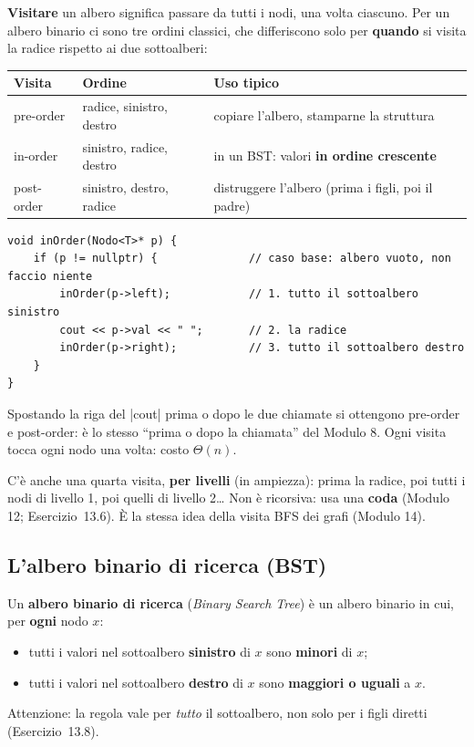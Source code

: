 \textbf{Visitare} un albero significa passare da tutti i nodi, una volta ciascuno.
Per un albero binario ci sono tre ordini classici, che differiscono solo per
\textbf{quando} si visita la radice rispetto ai due sottoalberi:
\begin{center}
\begin{tabular}{lll}
\toprule
\textbf{Visita} & \textbf{Ordine} & \textbf{Uso tipico} \\
\midrule
pre-order  & radice, sinistro, destro & copiare l'albero, stamparne la struttura \\
in-order   & sinistro, radice, destro & in un BST: valori \textbf{in ordine crescente} \\
post-order & sinistro, destro, radice & distruggere l'albero (prima i figli, poi il padre) \\
\bottomrule
\end{tabular}
\end{center}
\begin{lstlisting}
void inOrder(Nodo<T>* p) {
    if (p != nullptr) {              // caso base: albero vuoto, non faccio niente
        inOrder(p->left);            // 1. tutto il sottoalbero sinistro
        cout << p->val << " ";       // 2. la radice
        inOrder(p->right);           // 3. tutto il sottoalbero destro
    }
}
\end{lstlisting}
Spostando la riga del \cc|cout| prima o dopo le due chiamate si ottengono pre-order e
post-order: è lo stesso ``prima o dopo la chiamata'' del Modulo 8. Ogni visita tocca ogni
nodo una volta: costo $\Theta(n)$.

C'è anche una quarta visita, \textbf{per livelli} (in ampiezza): prima la radice, poi
tutti i nodi di livello 1, poi quelli di livello 2\ldots{} Non è ricorsiva: usa una
\textbf{coda} (Modulo 12; Esercizio~13.6). È la stessa idea della visita BFS dei grafi
(Modulo 14).

\subsection*{L'albero binario di ricerca (BST)}

\begin{definizione}
Un \textbf{albero binario di ricerca} (\emph{Binary Search Tree}) è un albero binario
in cui, per \textbf{ogni} nodo $x$:
\begin{itemize}
  \item tutti i valori nel sottoalbero \textbf{sinistro} di $x$ sono \textbf{minori} di
        $x$;
  \item tutti i valori nel sottoalbero \textbf{destro} di $x$ sono \textbf{maggiori o
        uguali} a $x$.
\end{itemize}
\end{definizione}
Attenzione: la regola vale per \emph{tutto} il sottoalbero, non solo per i figli diretti
(Esercizio~13.8).

